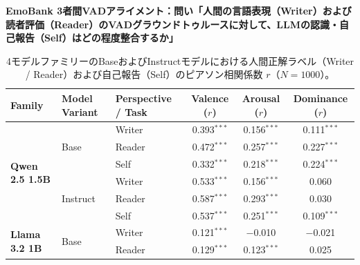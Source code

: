 
\begin{table}[htbp]
\centering
\small
\noindent\textbf{EmoBank 3者間VADアライメント：問い「人間の言語表現（Writer）および読者評価（Reader）のVADグラウンドトゥルースに対して、LLMの認識・自己報告（Self）はどの程度整合するか」}\par\vspace{1ex}
\caption{4モデルファミリーのBaseおよびInstructモデルにおける人間正解ラベル（Writer / Reader）および自己報告（Self）のピアソン相関係数 $r$（$N=1000$）。}
\label{tab:behavioral_emobank_3way_vad}
\begin{tabular}{lll ccc}
\toprule
\textbf{Family} & \textbf{Model Variant} & \textbf{Perspective / Task} & \textbf{Valence ($r$)} & \textbf{Arousal ($r$)} & \textbf{Dominance ($r$)} \\
\midrule
\multirow{6}{*}{\textbf{Qwen 2.5 1.5B}} & \multirow{3}{*}{Base}    & Writer     & 0.393$^{***}$            & 0.156$^{***}$            & 0.111$^{***}$            \\
                                 &                          & Reader     & 0.472$^{***}$            & 0.257$^{***}$            & 0.227$^{***}$            \\
                                 &                          & Self       & 0.332$^{***}$            & 0.218$^{***}$            & 0.224$^{***}$            \\
\cmidrule(lr){2-6}
                                 & \multirow{3}{*}{Instruct} & Writer     & 0.533$^{***}$            & 0.156$^{***}$            & 0.060\phantom{$^{***}$}  \\
                                 &                          & Reader     & 0.587$^{***}$            & 0.293$^{***}$            & 0.030\phantom{$^{***}$}  \\
                                 &                          & Self       & 0.537$^{***}$            & 0.251$^{***}$            & 0.109$^{***}$            \\
\midrule
\multirow{6}{*}{\textbf{Llama 3.2 1B}} & \multirow{3}{*}{Base}    & Writer     & 0.121$^{***}$            & $-$0.010\phantom{$^{***}$} & $-$0.021\phantom{$^{***}$} \\
                                 &                          & Reader     & 0.129$^{***}$            & 0.123$^{***}$            & 0.025\phantom{$^{***}$}  \\

\end{tabular}
\end{table}
